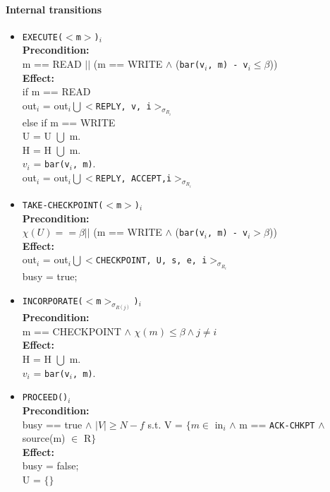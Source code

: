 \documentclass[letterpaper,twocolumn,10pt]{article}
\begin{document}
\paragraph{Internal transitions}

\begin{itemize}
\item{\texttt{EXECUTE($<$m$>$)$_{i}$}}\\
\textbf{Precondition:}\\
m == READ $||$ (m == WRITE $\wedge$ (\texttt{bar(v$_{i}$, m) - v$_{i} \le \beta$}))\\
\textbf{Effect:}\\
if m == READ\\
\hspace*{4pt} out$_{i}$ = out$_{i} \bigcup <$\texttt{REPLY, v, i}$>_{\sigma_{R_{i}}}$\\
else if m == WRITE\\
\hspace*{8pt} U = U $\bigcup$ m.\\
\hspace*{8pt} H = H $\bigcup$ m.\\
$v_{i}$ = \texttt{bar(v$_{i}$, m)}.\\
out$_{i}$ = out$_{i} \bigcup <$\texttt{REPLY, ACCEPT,i}$>_{\sigma_{R_{i}}}$

\item{\texttt{TAKE-CHECKPOINT($<$m$>$)$_{i}$}}\\
\textbf{Precondition:}\\
$\chi(U) == \beta ||$ (m == WRITE $\wedge$ (\texttt{bar(v$_{i}$, m) - v$_{i} > \beta$}))\\
\textbf{Effect:}\\
out$_{i}$ = out$_{i} \bigcup <$\texttt{CHECKPOINT, U, s, e, i}$>_{\sigma_{R_{i}}}$\\
busy = true;

\item{\texttt{INCORPORATE($<$m$>_{\sigma_{R(j)}}$)$_{i}$}}\\
\textbf{Precondition:}\\
m == CHECKPOINT $\wedge$ $\chi(m) \le \beta \wedge j \ne i$\\
\textbf{Effect:}\\
H = H $\bigcup$ m.\\
$v_{i}$ = \texttt{bar(v$_{i}$, m)}.

\item{\texttt{PROCEED()$_{i}$}}\\
\textbf{Precondition:}\\
busy == true $\wedge$ $|V| \ge N-f$ s.t.
V = $\{ m \in$ in$_{i}$ $\wedge$ m == \texttt{ACK-CHKPT} $\wedge$ source(m) $\in$ R$\}$\\
\textbf{Effect:}\\
busy = false;\\
U = $\{\}$


\end{itemize}
\end{document}
